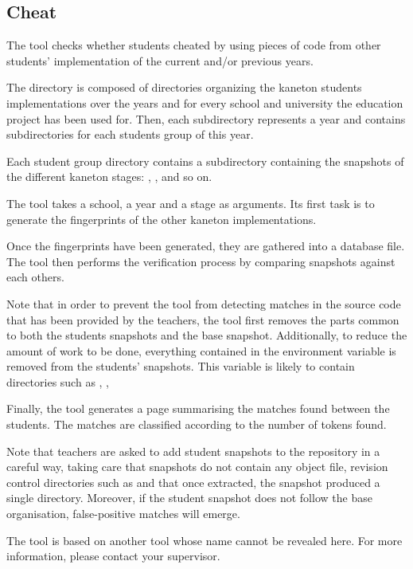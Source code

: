 %
%
%
%
%
%

%
%

\subsection{Cheat}
\label{section:cheat}

The  tool checks whether students cheated by using pieces of
code from other students' implementation of the current and/or previous years.

The  directory is composed of directories organizing the
kaneton students implementations over the years and for every school and
university the education project has been used for. Then, each subdirectory
represents a year and contains subdirectories for each students group of this
year.

Each student group directory contains a  subdirectory
containing the snapshots of the different kaneton stages: ,
,  and so on.

The  tool takes a school, a year and a stage as arguments. Its
first task is to generate the fingerprints of the other kaneton
implementations.

Once the fingerprints have been generated, they are gathered into a database
file. The tool then performs the verification process by comparing snapshots
against each others.

Note that in order to prevent the tool from detecting matches in the source
code that has been provided by the teachers, the tool first removes the parts
common to both the students snapshots and the base snapshot. Additionally,
to reduce the amount of work to be done, everything contained in the
 environment variable is removed from the students'
snapshots. This variable is likely to contain directories such as
, ,  \etc{}

Finally, the tool generates a  page summarising the matches
found between the students. The matches are classified according to the number
of tokens found.

Note that teachers are asked to add student snapshots to the repository
in a careful way, taking care that snapshots do not contain any object file,
revision control directories such as  \etc{} and that once
extracted, the snapshot produced a single  directory.
Moreover, if the student snapshot does not follow the base organisation,
false-positive matches will emerge.

The  tool is based on another tool whose name cannot be revealed
here. For more information, please contact your supervisor.
